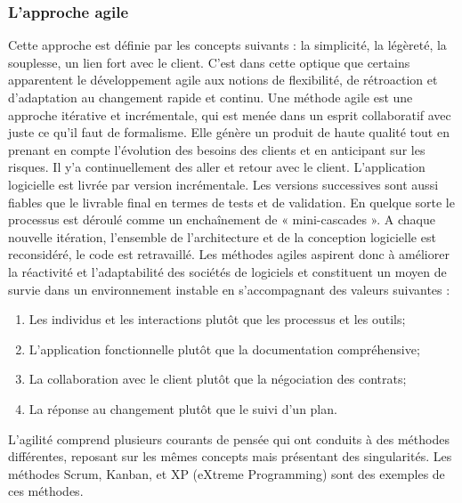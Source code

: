 \documentclass[a4paper, 12pt]{report}
\begin{document}
	\subsubsection{L'approche agile}
	Cette approche est définie par les concepts suivants : la simplicité, la légèreté, la souplesse, un lien fort avec le client. C’est dans cette optique que certains apparentent le développement agile aux notions de flexibilité, de rétroaction et d’adaptation au changement rapide et continu.
	\newline
	Une méthode agile est une approche itérative et incrémentale, qui est menée dans un esprit collaboratif avec juste ce qu’il faut de formalisme. Elle génère un produit de haute qualité tout en prenant en compte l’évolution des besoins des clients et en anticipant sur les risques. Il y’a continuellement des aller et retour avec le client. L’application logicielle est livrée par version incrémentale. Les versions successives sont aussi fiables que le livrable final en termes de tests et de validation. En quelque sorte le processus est déroulé comme un enchaînement de « mini-cascades ». A chaque nouvelle itération, l’ensemble de l’architecture et de la conception logicielle est reconsidéré, le code est retravaillé.
	\newline
	Les méthodes agiles aspirent donc à améliorer la réactivité et l’adaptabilité des sociétés de logiciels et constituent un moyen de survie dans un environnement instable en s’accompagnant des valeurs suivantes :
	\begin{enumerate}
		\item Les individus et les interactions plutôt que les processus et les outils;
		\item L’application fonctionnelle plutôt que la documentation compréhensive;
		\item La collaboration avec le client plutôt que la négociation des contrats;
		\item La réponse au changement plutôt que le suivi d’un plan.
		\newline
	\end{enumerate}
	L’agilité comprend plusieurs courants de pensée qui ont conduits à des méthodes différentes, reposant sur les mêmes concepts mais présentant des singularités. Les méthodes Scrum, Kanban, et XP (eXtreme Programming) sont des exemples de ces méthodes.
	\newline\newline
	
\end{document}
